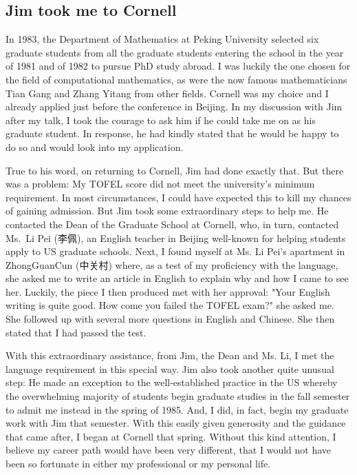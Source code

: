 \documentclass[CJK,11pt]{amsart}
\theoremstyle{definition}
\begin{document}
\begin{CJK*}{UTF8}{gbsn}
\section{Jim took me to Cornell}
In 1983, the Department of Mathematics at Peking University selected six graduate students from all the graduate students entering the school in the year of 1981 and of 1982 to pursue PhD study abroad. I was luckily the one chosen for the field of computational mathematics, as were the now famous mathematicians Tian Gang and Zhang Yitang from other fields. Cornell was my choice and I already applied just before the conference in Beijing.  In my discussion with Jim after my talk, I took the courage to ask him if he could take me on as his graduate student. In response, he had kindly stated that he would be happy to do so and would look into my application. 

True to his word, on returning to Cornell, Jim had done exactly that. But there was a problem: My TOFEL score did not meet the university's minimum requirement. In most circumstances, I could have expected this to kill my chances of gaining admission. But Jim took some extraordinary steps to help me. He contacted the Dean of the Graduate School at Cornell, who, in turn, contacted Ms.~Li Pei (李佩), an English teacher in Beijing well-known for helping students apply to US graduate schools. Next, I found myself at Ms. Li Pei's apartment in ZhongGuanCun (中关村) where,  as a test of my proficiency with the language,  she asked me to write an article in English to explain why and how I came to see her. Luckily, the piece I then produced met with her approval: "Your English writing is quite good. How come you failed the TOFEL exam?" she asked me. She followed up with several more questions in English and Chinese. She then stated that I had passed the test.

With this extraordinary assistance, from Jim, the Dean and Ms. Li, I met the language requirement in this special way. Jim also took another quite unusual step: He made an exception to the well-established practice in the US whereby the overwhelming majority of students begin graduate studies in the fall semester to admit me instead in the spring of 1985. And, I did, in fact, begin my graduate work with Jim that semester. With this easily given generosity and the guidance that came after, I began at Cornell that spring. Without this kind attention, I believe my career path would have been very different, that I would not have been so fortunate in either my professional or my personal life.  %



\end{CJK*}
\end{document}

